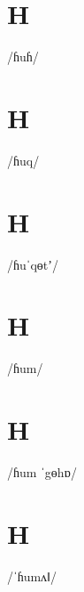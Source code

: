 \documentclass[10pt,a4paper,twoside]{book}
\begin{document}
\section*{H}

\begin{multicols}{3}
 {/ɦuɦ/} {}
\end{multicols}

\section*{H}

\begin{multicols}{3}
 {/ɦuq/} {}
\end{multicols}

\section*{H}

\begin{multicols}{3}
 {/ɦuˈqɵtʼ/} {}
\end{multicols}

\section*{H}

\begin{multicols}{3}
 {/ɦum/} {}
\end{multicols}

\section*{H}

\begin{multicols}{3}
 {/ɦum ˈgɵhɒ/} {}
\end{multicols}

\section*{H}

\begin{multicols}{3}
 {/ˈɦumʌǁ/} {}
\end{multicols}
\end{document}
